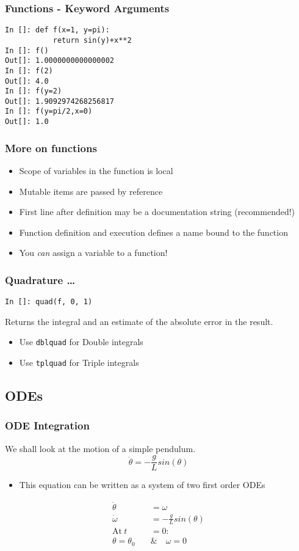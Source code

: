 \documentclass[14pt,compress]{beamer}
\newcommand{\typ}[1]{\lstinline{#1}}
\begin{document}
\begin{frame}[fragile]
\frametitle{Functions - Keyword Arguments}
\begin{lstlisting}
In []: def f(x=1, y=pi):
           return sin(y)+x**2
In []: f()
Out[]: 1.0000000000000002
In []: f(2)
Out[]: 4.0
In []: f(y=2)
Out[]: 1.9092974268256817
In []: f(y=pi/2,x=0)
Out[]: 1.0
\end{lstlisting}
\end{frame}

\begin{frame}[fragile]
  \frametitle{More on functions}
  \begin{itemize}
  \item Scope of variables in the function is local
  \item Mutable items are \alert{passed by reference}
  \item First line after definition may be a documentation string
    (\alert{recommended!})
  \item Function definition and execution defines a name bound to the
    function
  \item You \emph{can} assign a variable to a function!
  \end{itemize}
\end{frame}

\begin{frame}[fragile]
\frametitle{Quadrature \ldots}
\begin{lstlisting}
In []: quad(f, 0, 1)
\end{lstlisting}
Returns the integral and an estimate of the absolute error in the result.
\begin{itemize}
\item Use \typ{dblquad} for Double integrals
\item Use \typ{tplquad} for Triple integrals
\end{itemize}
\end{frame}

\subsection{ODEs}

\begin{frame}[fragile]
\frametitle{ODE Integration}
We shall look at the motion of a simple pendulum. 
\begin{equation*}
\ddot{\theta} = -\frac{g}{L}sin(\theta)
\end{equation*}
\begin{itemize}
\item This equation can be written as a system of two first order ODEs
\end{itemize}
\begin{align}
\dot{\theta} &= \omega \\
\dot{\omega} &= -\frac{g}{L}sin(\theta) \\
 \text{At}\ t &= 0 : \nonumber \\
 \theta = \theta_0\quad & \&\quad  \omega = 0 \nonumber
\end{align}
\end{frame}
\end{document}
